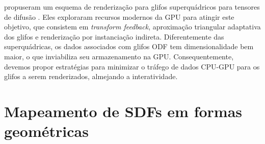  propuseram um esquema de renderização para glifos superquádricos para tensores de difusão \cite{Kindlmann2004}. Eles exploraram recursos modernos da GPU para atingir este objetivo, que consistem em \textit{transform feedback}, aproximação triangular adaptativa dos glifos e renderização por instanciação indireta. Diferentemente das superquádricas, os dados associados com glifos ODF tem dimensionalidade bem maior, o que inviabiliza seu armazenamento na GPU. Consequentemente, devemos propor estratégias para minimizar o tráfego de dados CPU-GPU para os glifos a serem renderizados, almejando a interatividade.






\section{Mapeamento de SDFs em formas geométricas}
\label{sec::renderizacao_de_glifos_ODF}

